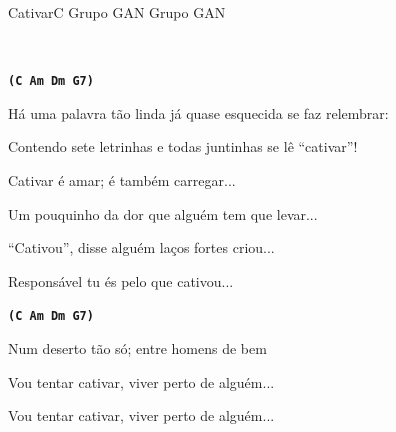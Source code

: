 \documentclass[a4,12pt,oneside]{book}
\newcommand{\RevDate}{\today}
\newcommand{\NotCCLIed}{\relax}
\begin{document}
\begin{song}{Cativar}{C}
  {Grupo GAN}
  {Grupo GAN}
  {}
  {\NotCCLIed}
  
	\renewcommand{\RevDate}{12 de maio de 2014}
  
	
	\ifChordBk
	 	{\vspace{-2em}\flushright{\Cchord \quad \Amchord \quad \Dmchord \quad \Gschord}\\}
	 	\vspace{-1em}
	\fi
	
	\begin{SBVerse*}
		{\normalsize\texttt{\textbf{(C Am Dm G7)}}}
	
		Há uma palavra tão linda já quase esquecida se faz relembrar:
		
		Contendo sete letrinhas e todas juntinhas se lê “cativar”!
		
		Cativar é amar; é também carregar...
		
		Um pouquinho da dor que alguém tem que levar...
		
		“Cativou”, disse alguém  laços fortes criou...
		
		Responsável tu és pelo que cativou...
	\end{SBVerse*}
	
	
	\begin{SBVerse*}
		{\normalsize\texttt{\textbf{(C Am Dm G7)}}}

		Num deserto tão só; entre homens de bem
		
		Vou tentar cativar, viver perto de alguém...
		
		Vou tentar cativar, viver perto de alguém...
	\end{SBVerse*}
\end{song}
\end{document}
